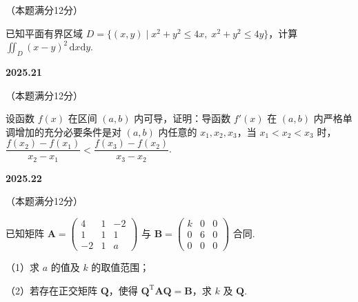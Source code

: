 \documentclass[UTF8,12pt,fontset=windows]{ctexart}
\begin{document}
（本题满分12分）

已知平面有界区域 $D=\{(x,y)\mid x^2+y^2\leqslant4x,\;x^2+y^2\leqslant4y\}$，计算 $\iint_D(x-y)^2\,\mathrm{d}x\mathrm{d}y$.

\vfill
\newpage
{\large\bfseries 2025.21}

（本题满分12分）

设函数 $f(x)$ 在区间 $(a,b)$ 内可导，证明：导函数 $f'(x)$ 在 $(a,b)$ 内严格单调增加的充分必要条件是对 $(a,b)$ 内任意的 $x_1,x_2,x_3$，当 $x_1<x_2<x_3$ 时，$\dfrac{f(x_2)-f(x_1)}{x_2-x_1}<\dfrac{f(x_3)-f(x_2)}{x_3-x_2}$.

\vfill
\newpage
{\large\bfseries 2025.22}

（本题满分12分）

已知矩阵 $\boldsymbol{A}=\begin{pmatrix}4&1&-2\\1&1&1\\-2&1&a\end{pmatrix}$ 与 $\boldsymbol{B}=\begin{pmatrix}k&0&0\\0&6&0\\0&0&0\end{pmatrix}$ 合同.

（1）求 $a$ 的值及 $k$ 的取值范围；

（2）若存在正交矩阵 $\boldsymbol{Q}$，使得 $\boldsymbol{Q}^{\mathrm{T}}\boldsymbol{AQ}=\boldsymbol{B}$，求 $k$ 及 $\boldsymbol{Q}$.

\vfill
\end{document}
